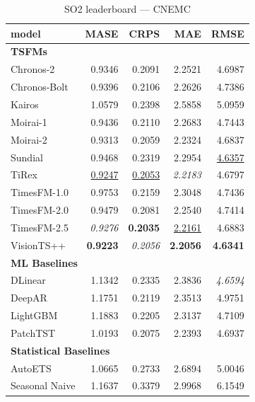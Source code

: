 \begin{table}[H]
\caption{SO2 leaderboard --- CNEMC}
\centering
\begin{small}
\begin{tabular}{lrrrr}
\toprule
model & MASE & CRPS & MAE & RMSE \\
\midrule
\multicolumn{5}{l}{\textbf{TSFMs}} \\
Chronos-2 & 0.9346 & 0.2091 & 2.2521 & 4.6987 \\
Chronos-Bolt & 0.9396 & 0.2106 & 2.2626 & 4.7386 \\
Kairos & 1.0579 & 0.2398 & 2.5858 & 5.0959 \\
Moirai-1 & 0.9436 & 0.2110 & 2.2683 & 4.7443 \\
Moirai-2 & 0.9313 & 0.2059 & 2.2324 & 4.6837 \\
Sundial & 0.9468 & 0.2319 & 2.2954 & \underline{4.6357} \\
TiRex & \underline{0.9247} & \underline{0.2053} & \textit{2.2183} & 4.6797 \\
TimesFM-1.0 & 0.9753 & 0.2159 & 2.3048 & 4.7436 \\
TimesFM-2.0 & 0.9479 & 0.2081 & 2.2540 & 4.7414 \\
TimesFM-2.5 & \textit{0.9276} & \textbf{0.2035} & \underline{2.2161} & 4.6883 \\
VisionTS++ & \textbf{0.9223} & \textit{0.2056} & \textbf{2.2056} & \textbf{4.6341} \\
\midrule
\multicolumn{5}{l}{\textbf{ML Baselines}} \\
DLinear & 1.1342 & 0.2335 & 2.3836 & \textit{4.6594} \\
DeepAR & 1.1751 & 0.2119 & 2.3513 & 4.9751 \\
LightGBM & 1.1883 & 0.2205 & 2.3137 & 4.7109 \\
PatchTST & 1.0193 & 0.2075 & 2.2393 & 4.6937 \\
\midrule
\multicolumn{5}{l}{\textbf{Statistical Baselines}} \\
AutoETS & 1.0665 & 0.2733 & 2.6894 & 5.0046 \\
Seasonal Naive & 1.1637 & 0.3379 & 2.9968 & 6.1549 \\
\bottomrule
\end{tabular}
\end{small}
\end{table}